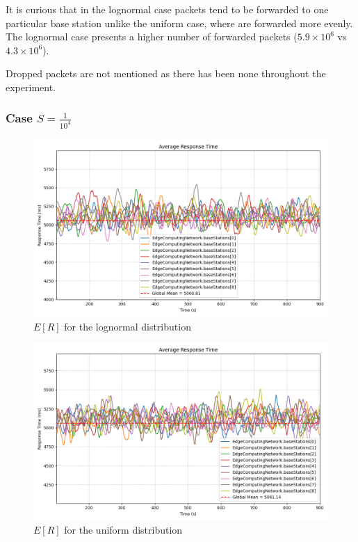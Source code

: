 \documentclass{report}
\begin{document}
\begin{flushleft}
It is curious that in the lognormal case packets tend to be forwarded to one particular base station unlike the uniform case, where are forwarded more evenly. The lognormal case presents a higher number of forwarded packets ($5.9\times10^6$ vs $4.3\times10^6$).
\vspace{1em}

Dropped packets are not mentioned as there has been none throughout the experiment.
\end{flushleft}

\subsubsection*{Case $S=\frac{1}{10^4}$}

\begin{figure}[H]
    \centering
    \includegraphics[width=\textwidth]{img/plots/log_1e4_B/resptime.png}
    \caption{$E[R]$ for the lognormal distribution}
\end{figure}

\begin{figure}[H]
    \centering
    \includegraphics[width=\textwidth]{img/plots/uni_1e4_B/resptime.png}
    \caption{$E[R]$ for the uniform distribution}
\end{figure}
\end{document}
